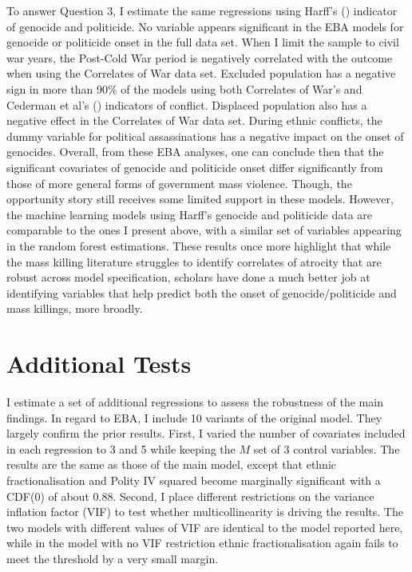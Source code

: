 \documentclass[a4paper,12pt]{article}
\begin{document}
To answer Question 3, I estimate the same regressions using Harff's (\citeyear{harff2003no}) indicator of genocide and politicide. No variable appears significant in the EBA models for genocide or politicide onset in the full data set. When I limit the sample to civil war years, the Post-Cold War period is negatively correlated with the outcome when using the Correlates of War data set. Excluded population has a negative sign in more than 90\% of the models using both Correlates of War's and Cederman et al's (\citeyear{cederman2010ethnic}) indicators of conflict. Displaced population also has a negative effect in the Correlates of War data set. During ethnic conflicts, the dummy variable for political assassinations has a negative impact on the onset of genocides. Overall, from these EBA analyses, one can conclude then that the significant covariates of genocide and politicide onset differ significantly from those of more general forms of government mass violence. Though, the opportunity story still receives some limited support in these models. However, the machine learning models using Harff's genocide and politicide data are comparable to the ones I present above, with a similar set of variables appearing in the random forest estimations. These results once more highlight that while the mass killing literature struggles to identify correlates of atrocity that are robust across model specification, scholars have done a much better job at identifying variables that help predict both the onset of genocide/politicide and mass killings, more broadly.

	
\section{Additional Tests}
\label{sec:additional-tests}

I estimate a set of additional regressions to assess the robustness of the main findings. In regard to EBA, I include 10 variants of the original model. They largely confirm the prior results. First, I varied the number of covariates included in each regression to 3 and 5 while keeping the $M$ set of 3 control variables. The results are the same as those of the main model, except that ethnic fractionalisation and Polity IV squared become marginally significant with a CDF(0) of about 0.88. Second, I place different restrictions on the variance inflation factor (VIF) to test whether multicollinearity is driving the results. The two models with different values of VIF are identical to the model reported here, while in the model with no VIF restriction ethnic fractionalisation again fails to meet the threshold by a very small margin. 
	
\end{document}
